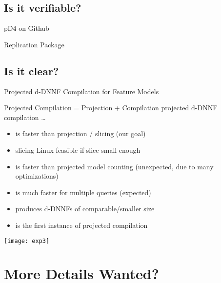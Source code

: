 \documentclass[
	aspectratio=169, %
	8pt, %
]{beamer}
\begin{document}
\subsection{Is it verifiable?}
\begin{frame}{\insertsubsection}
	\begin{fancycolumns}
		\begin{notetight}{pD4 on Github}
			\centering{}
		\end{notetight}
	\nextcolumn
		\begin{notetight}{Replication Package}
			\centering{}			
		\end{notetight}
	\end{fancycolumns}
\end{frame}

\subsection{Is it clear?}
\begin{frame}{\insertsubsection\hfill{}Projected d-DNNF Compilation for Feature Models}
	\pic[width=\linewidth,trim={0\width} {.4\height} {0\width} {.4\height},clip,page=9]{pD4}
	\begin{fancycolumns}[widths={52}]
		\begin{note}{Projected Compilation = Projection + Compilation}
			projected d-DNNF compilation \ldots
			\begin{itemize}
				\item is faster than projection / slicing (our  goal)
				\item slicing Linux feasible if slice small enough
				\item is faster than projected model counting (unexpected, due to many optimizations)
				\item is much faster for multiple queries (expected)
				\item produces d-DNNFs of comparable/smaller size
				\item is the first instance of projected compilation
			\end{itemize}
		\end{note}
		\nextcolumn
		\texttt{[image: exp3]}		
	\end{fancycolumns}
\end{frame}

\againtitle

\section{More Details Wanted?}
\end{document}
